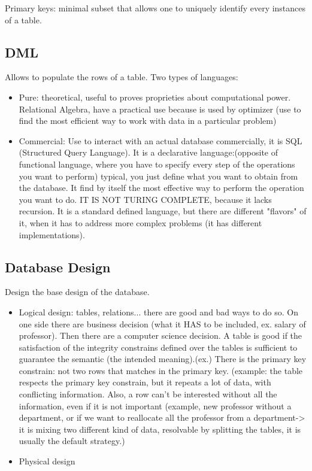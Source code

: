 \documentclass[11pt]{report}
\theoremstyle{definition}
\theoremstyle{remark}
\begin{document}
Primary keys: minimal subset that allows one to uniquely identify every instances of a table.

\subsection*{DML}
Allows to populate the rows of a table. Two types of languages:
\begin{itemize}
    \item Pure: theoretical, useful to proves proprieties about computational power. Relational Algebra, have a practical use because is used by optimizer (use to find the most efficient way to work with data in a particular problem)
    \item Commercial: Use to interact with an actual database commercially, it is SQL (Structured Query Language). It is a declarative language:(opposite of functional language, where you have to specify every step of the operations you want to perform) typical, you just define what you want to obtain from the database. It find by itself the most effective way to perform the operation you want to do. IT IS NOT TURING COMPLETE, because it lacks recursion. It is a standard defined language, but there are different "flavors" of it, when it has to address more complex problems (it has different implementations).
\end{itemize}


\subsection*{Database Design}
Design the base design of the database. 
\begin{itemize}
    \item Logical design: tables, relations... there are good and bad ways to do so. On one side there are business decision (what it HAS to be included, ex. salary of professor). Then there are a computer science decision. A table is good if the satisfaction of the integrity constrains defined over the tables  is sufficient to guarantee the semantic (the intended meaning).(ex.) There is the primary key constrain: not two rows that matches in the primary key. (example: the table respects the primary key constrain, but it repeats a lot of data, with conflicting information. Also, a row can't be interested without all the information, even if it is not important (example, new professor without a department, or if we want to reallocate all the professor from a department-> it is mixing two different kind of data, resolvable by splitting the tables, it is usually the default strategy.) 
    \item Physical design
\end{itemize}
\end{document}
